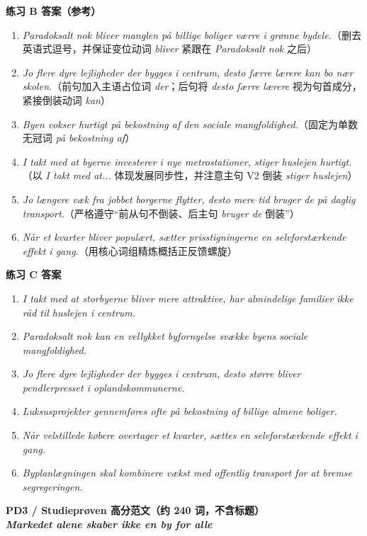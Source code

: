 \begin{answerbox}
\textbf{练习 B 答案（参考）}
\begin{enumerate}
  \item \textit{Paradoksalt nok bliver manglen på billige boliger værre i grønne bydele.}（删去英语式逗号，并保证变位动词 \textit{bliver} 紧跟在 \textit{Paradoksalt nok} 之后）
  \item \textit{Jo flere dyre lejligheder der bygges i centrum, desto færre lærere kan bo nær skolen.}（前句加入主语占位词 \textit{der}；后句将 \textit{desto færre lærere} 视为句首成分，紧接倒装动词 \textit{kan}）
  \item \textit{Byen vokser hurtigt på bekostning af den sociale mangfoldighed.}（固定为单数无冠词 \textit{på bekostning af}）
  \item \textit{I takt med at byerne investerer i nye metrostationer, stiger huslejen hurtigt.}（以 \textit{I takt med at...} 体现发展同步性，并注意主句 V2 倒装 \textit{stiger huslejen}）
  \item \textit{Jo længere væk fra jobbet borgerne flytter, desto mere tid bruger de på daglig transport.}（严格遵守“前从句不倒装、后主句 \textit{bruger de} 倒装”）
  \item \textit{Når et kvarter bliver populært, sætter prisstigningerne en selvforstærkende effekt i gang.}（用核心词组精炼概括正反馈螺旋）
\end{enumerate}

\textbf{练习 C 答案}
\begin{enumerate}
  \item \textit{I takt med at storbyerne bliver mere attraktive, har almindelige familier ikke råd til huslejen i centrum.}
  \item \textit{Paradoksalt nok kan en vellykket byfornyelse svække byens sociale mangfoldighed.}
  \item \textit{Jo flere dyre lejligheder der bygges i centrum, desto større bliver pendlerpresset i oplandskommunerne.}
  \item \textit{Luksusprojekter gennemføres ofte på bekostning af billige almene boliger.}
  \item \textit{Når velstillede købere overtager et kvarter, sættes en selvforstærkende effekt i gang.}
  \item \textit{Byplanlægningen skal kombinere vækst med offentlig transport for at bremse segregeringen.}
\end{enumerate}

\textbf{PD3 / Studieprøven 高分范文（约 240 词，不含标题）}\\
\textit{\textbf{Markedet alene skaber ikke en by for alle}}


\end{answerbox}
